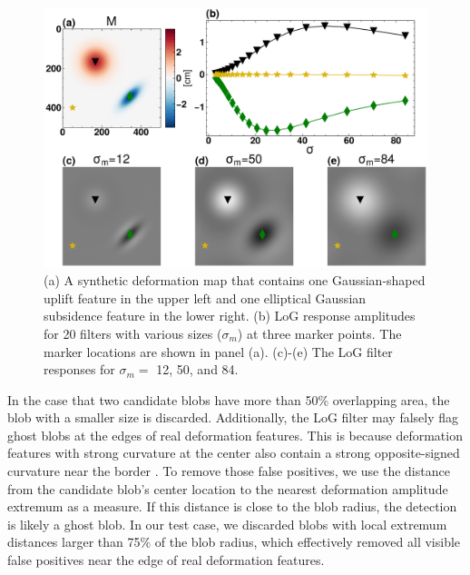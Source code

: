 \documentclass{utexasthesis}
\begin{document}
\begin{figure}[hbt!]
\centering
\includegraphics[width=0.98\linewidth]{paper2/figures/figure2_log_response.pdf}
\caption{
(a) A synthetic deformation map that contains one Gaussian-shaped uplift feature in the upper left and one elliptical Gaussian subsidence feature in the lower right. (b) LoG response amplitudes for 20 filters with various sizes ($\sigma_m$) at three marker points. The marker locations are shown in panel (a). (c)-(e) The LoG filter responses for $\sigma_m=$ 12, 50, and 84.}
\label{fig:log-response}
%
\end{figure}

In the case that two candidate blobs have more than 50\% overlapping area, the blob with a smaller size is discarded. 
Additionally, the LoG filter may falsely flag ghost blobs at the edges of real deformation features. This is because deformation features with strong curvature at the center also contain a strong opposite-signed curvature near the border \cite{Lindeberg1998FeatureDetectionAutomatic}. To remove those false positives, we use the distance from the candidate blob's center location to the nearest deformation amplitude extremum as a measure. If this distance is close to the blob radius, the detection is likely a ghost blob. In our test case, we discarded blobs with local extremum distances larger than 75$\%$ of the blob radius, which effectively removed all visible false positives near the edge of real deformation features.
\end{document}
